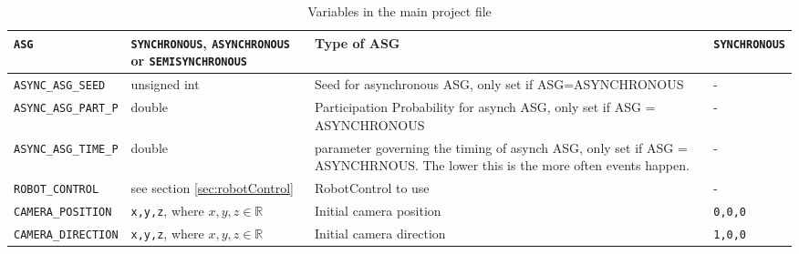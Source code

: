 \begin{sidewaystable}
\begin{tabular}{|l|p{}|p{}|p{}|}
		\texttt{ASG} & \texttt{SYNCHRONOUS}, \texttt{ASYNCHRONOUS} or \texttt{SEMISYNCHRONOUS} & Type of ASG & \texttt{SYNCHRONOUS}\\\hline
		  \texttt{ASYNC\_ASG\_SEED} & unsigned int & Seed for asynchronous ASG, only set if ASG=ASYNCHRONOUS & - \\\hline
		    \texttt{ASYNC\_ASG\_PART\_P} & double & Participation Probability for asynch ASG, only set if ASG = ASYNCHRONOUS & - \\\hline
		 \texttt{ASYNC\_ASG\_TIME\_P} & double & parameter governing the timing of asynch ASG, only set if ASG = ASYNCHRNOUS. The lower this is the more often events happen. & - \\\hline
		 
		\texttt{ROBOT\_CONTROL} &  see section \ref{sec:robotControl} & RobotControl to use & -\\\hline
		\texttt{CAMERA\_POSITION} &  \texttt{x,y,z}, where $x,y,z\in\mathbb{R}$& Initial camera position & \texttt{0,0,0}\\\hline
		\texttt{CAMERA\_DIRECTION} &  \texttt{x,y,z}, where $x,y,z\in\mathbb{R}$& Initial camera direction & \texttt{1,0,0}\\\hline


		 
	\end{tabular}
	\caption{Variables in the main project file}\label{tab:mainvars}
\end{sidewaystable}
\thispagestyle{empty}
\clearpage

